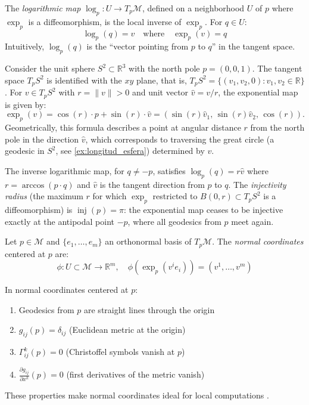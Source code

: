 \begin{definition}\label{def:mapa_logaritmico}
The \textit{logarithmic map} $\log_p: U \to T_p\mathcal{M}$, defined on a neighborhood $U$ of $p$ where $\exp_p$ is a diffeomorphism, is the local inverse of $\exp_p$. For $q \in U$:
\[
\log_p(q) = v \quad \text{where} \quad \exp_p(v) = q
\]
Intuitively, $\log_p(q)$ is the ``vector pointing from $p$ to $q$'' in the tangent space.
\end{definition}

\begin{example}\label{ex:mapa_exp_esfera}
Consider the unit sphere $S^2 \subset \mathbb{R}^3$ with the north pole $p = (0, 0, 1)$. The tangent space $T_p S^2$ is identified with the $xy$ plane, that is, $T_p S^2 = \{(v_1, v_2, 0) : v_1, v_2 \in \mathbb{R}\}$. For $v \in T_p S^2$ with $r = \|v\| > 0$ and unit vector $\hat{v} = v/r$, the exponential map is given by:
\[
\exp_p(v) = \cos(r) \cdot p + \sin(r) \cdot \hat{v} = (\sin(r) \hat{v}_1, \, \sin(r) \hat{v}_2, \, \cos(r)).
\]
Geometrically, this formula describes a point at angular distance $r$ from the north pole in the direction $\hat{v}$, which corresponds to traversing the great circle (a geodesic in $S^2$, see \autoref{ex:longitud_esfera}) determined by $v$.

The inverse logarithmic map, for $q \neq -p$, satisfies $\log_p(q) = r \hat{v}$ where $r = \arccos(p \cdot q)$ and $\hat{v}$ is the tangent direction from $p$ to $q$. The \textit{injectivity radius} (the maximum $r$ for which $\exp_p$ restricted to $B(0, r) \subset T_p S^2$ is a diffeomorphism) is $\operatorname{inj}(p) = \pi$: the exponential map ceases to be injective exactly at the antipodal point $-p$, where all geodesics from $p$ meet again.
\end{example}

\begin{definition}\label{def:coordenadas_normales}
Let $p \in \mathcal{M}$ and $\{e_1, \ldots, e_m\}$ an orthonormal basis of $T_p\mathcal{M}$. The \textit{normal coordinates} centered at $p$ are:
\[
\phi: U \subset \mathcal{M} \to \mathbb{R}^m, \quad \phi(\exp_p(v^i e_i)) = (v^1, \ldots, v^m)
\]
\end{definition}

\begin{proposition}\label{prop:coordenadas_normales}
In normal coordinates centered at $p$:
\begin{enumerate}
	\item Geodesics from $p$ are straight lines through the origin
	\item $g_{ij}(p) = \delta_{ij}$ (Euclidean metric at the origin)
	\item $\Gamma^k_{ij}(p) = 0$ (Christoffel symbols vanish at $p$)
	\item $\frac{\partial g_{ij}}{\partial x^k}(p) = 0$ (first derivatives of the metric vanish)
\end{enumerate}
These properties make normal coordinates ideal for local computations \citep[cf.][Proposition~5.24]{lee2018introduction}.
\end{proposition}

